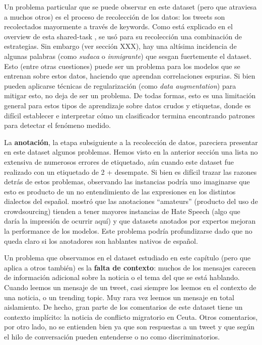 Un problema particular que se puede observar en este dataset (pero que atraviesa a muchos otros) es el proceso de recolección de los datos: los tweets son recolectados mayormente a través de keywords. Como está explicado en el overview de esta shared-task \cite{hateval2019semeval}, se usó para su recolección una combinación de estrategias. Sin embargo (ver sección XXX), hay una altísima incidencia de algunas palabras (como \emph{sudaca} o \emph{inmigrante}) que sesgan fuertemente el dataset. Esto (entre otras cuestiones) puede ser un problema para los modelos que se entrenan sobre estos datos, haciendo que aprendan correlaciones espurias. Si bien pueden aplicarse técnicas de regularización (como \emph{data augmentation}) para mitigar
esto, no deja de ser un problema. De todas formas, esto es una limitación general para estos tipos de aprendizaje sobre datos crudos y etiquetas, donde es difícil establecer e interpretar cómo un clasificador termina encontrando patrones para detectar el fenómeno medido.

La \textbf{anotación}, la etapa subsiguiente a la recolección de datos, pareciera presentar en este dataset algunos problemas. Hemos visto en la anterior sección una lista no extensiva de numerosos errores de etiquetado, aún cuando este dataset fue realizado con un etiquetado de 2 + desempate. Si bien es difícil trazar las razones detrás de estos problemas, observando las instancias podría uno imaginarse que esto es producto de un no entendimiento de las expresiones en los distintos dialectos del español. \citet{waseem-2016-racist} mostró que las anotaciones ``amateurs'' (producto del uso de crowdsourcing) tienden a tener mayores instancias de Hate Speech (algo que daría la impresión de ocurrir aquí) y que datasets anotados por expertos mejoran la performance de los modelos. Este problema podría profundizarse dado que no queda claro si los anotadores son hablantes nativos de español.


Un problema que observamos en el dataset estudiado en este capítulo (pero que aplica a otros también) es la \textbf{falta de contexto}: muchos de los mensajes carecen de información adicional sobre la noticia o el tema del que se está hablando. Cuando leemos un mensaje de un tweet, casi siempre los leemos en el contexto de una noticia, o un trending topic. Muy rara vez leemos un mensaje en total aislamiento. De hecho, gran parte de los comentarios de este dataset tiene un contexto implícito: la noticia de conflicto migratorio en Ceuta. Otros comentarios, por otro lado, no se entienden bien ya que son respuestas a un tweet y que según el hilo de conversación pueden entenderse o no como discriminatorios.

